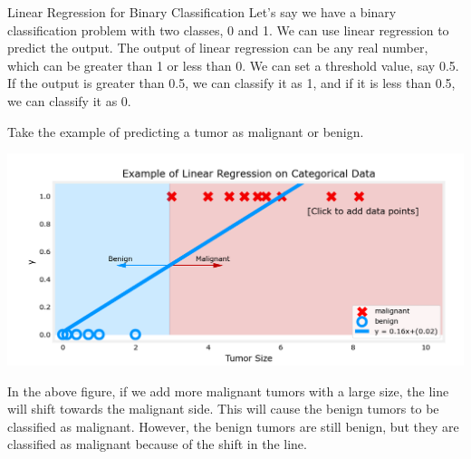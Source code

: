 \begin{exbox}{Linear Regression for Binary Classification}{}
    \hspace{2em}Let's say we have a binary classification problem with two classes, 0 and 1.
    We can use linear regression to predict the output.
    The output of linear regression can be any real number, which can be greater than 1 or less than 0.
    We can set a threshold value, say 0.5. If the output is greater than 0.5, we can classify it as 1, and if it is less than 0.5, we can classify it as 0.\par
    \hspace{2em}Take the example of predicting a tumor as malignant or benign.\par
    \includegraphics*[width=\textwidth]{images/5.1_1.png}\par
    \hspace{2em}In the above figure, if we add more malignant tumors with a large size, the line will shift towards the malignant side.
    This will cause the benign tumors to be classified as malignant.
    However, the benign tumors are still benign, but they are classified as malignant because of the shift in the line.
\end{exbox}


